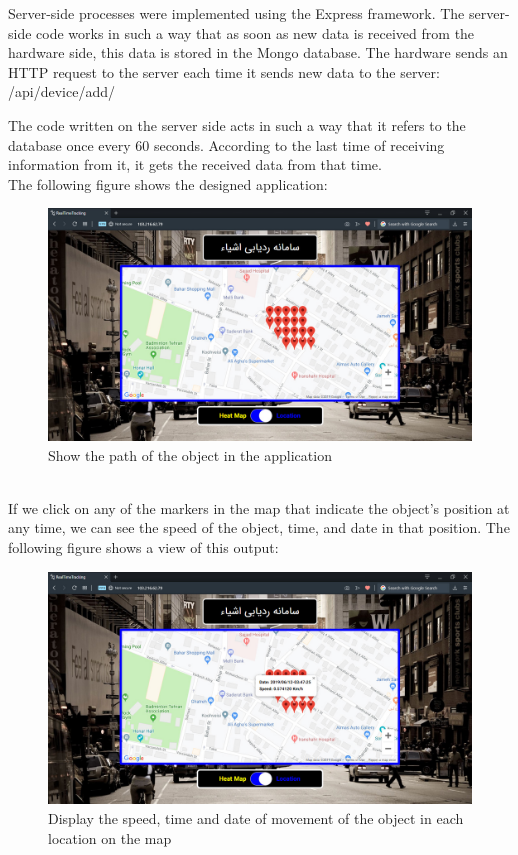 Server-side processes were implemented using the Express framework. The server-side code works in such a way that as soon as new data is received from the hardware side, this data is stored in the Mongo database. The hardware sends an HTTP request to the server each time it sends new data to the server: /api/device/add/

The code written on the server side acts in such a way that it refers to the database once every 60 seconds. According to the last time of receiving information from it, it gets the received data from that time. \\
The following figure shows the designed application:
 \begin{figure}[!h]
	\centerline{\includegraphics[width=.6\textwidth]{webapp3}}
	\caption{Show the path of the object in the application}
\end{figure}\\
If we click on any of the markers in the map that indicate the object's position at any time, we can see the speed of the object, time, and date in that position. The following figure shows a view of this output:
\begin{figure}[!h]
	\centerline{\includegraphics[width=.9\textwidth]{webapp4}}
	\caption{Display the speed, time and date of movement of the object in each location on the map}
\end{figure}
